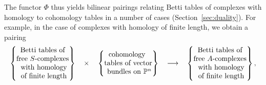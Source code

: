 \documentclass[12pt]{amsart}
\theoremstyle{definition}
\theoremstyle{remark}
\newcommand{\PP}{\mathbb{P}}
\begin{document}
The functor $\Phi$ thus yields bilinear pairings relating Betti tables of complexes with homology to cohomology tables in a number of cases (Section~\ref{sec:duality}).  For example, in the case of complexes with homology of finite length, we obtain a pairing
 \begin{equation}%
\label{eqn:**}
\begin{tabular}{c c c c c}
$\left\{\begin{matrix}
\text{Betti tables of} \\ \text{free $S$-complexes}\\
\text{ with homology}\\ \text{ of finite length}
\end{matrix}\right\}$
&
$\times$
&
$\left\{\begin{matrix}
\text{cohomology }\\
\text{tables of vector}\\
\text{ bundles on } \PP^n
\end{matrix}\right\}$
&
$\longrightarrow$
&
$\left\{\begin{matrix}
\text{Betti tables of} \\ \text{free $A$-complexes}\\
\text{ with homology}\\ \text{ of finite length}
\end{matrix}\right\},$
\end{tabular}
\end{equation}
\end{document}
